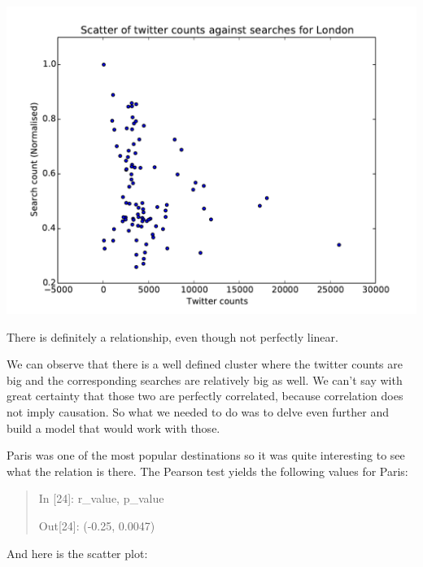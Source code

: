\documentclass[minf,frontabs,twoside,singlespacing,parskip]{infthesis} %
\begin{document}
\includegraphics[width=\textwidth]{London}

There is definitely a relationship, even though not perfectly linear.

We can observe that there is a well defined cluster where the twitter counts are big and the corresponding searches are relatively big as well. We can't say with great certainty that those two are perfectly correlated, because correlation does not imply causation. So what we needed to do was to delve even further and build a model that would work with those.


Paris was one of the most popular destinations so it was quite interesting to see what the relation is there. The Pearson test yields the following values for Paris:
\begin{quotation}
In [24]: r\_value, p\_value

Out[24]: (-0.25, 0.0047)
\end{quotation}
\newpage
And here is the scatter plot:
\end{document}
